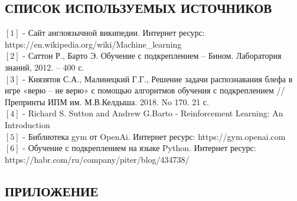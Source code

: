 \documentclass[a4paper]{report}
\theoremstyle{definition}
\theoremstyle{plain}
\theoremstyle{remark}
\theoremstyle{remark}
\theoremstyle{definition}
\begin{document}
\newpage
\begin{center}
    \section*{СПИСОК ИСПОЛЬЗУЕМЫХ ИСТОЧНИКОВ} 
\end{center}
$[1]$ - Сайт англоязычной википедии. Интернет ресурс: https://en.wikipedia.org/wiki/Machine\_learning \\
$[2]$ -  Саттон Р., Барто Э. Обучение с подкреплением – Бином. Лаборатория знаний,
2012. – 400 с.\\
$[3]$ - Князятов С.А., Малинецкий Г.Г.,
Решение задачи распознавания блефа в игре «верю – не верю» с помощью алгоритмов
обучения с подкреплением // Препринты ИПМ им. М.В.Келдыша. 2018. No 170. 21 с.\\
$[4]$ - Richard S. Sutton and Andrew G.Barto - Reinforcement Learning:
An Introduction \\
$[5]$ - Библиотека gym от OpenAi. Интернет ресурс: https://gym.openai.com \\
$[6]$ - Обучение с подкреплением на языке Python. Интернет ресурс: https://habr.com/ru/company/piter/blog/434738/ \\


\newpage
\begin{center}
\section*{ПРИЛОЖЕНИЕ}
\end{center}

\end{document}
